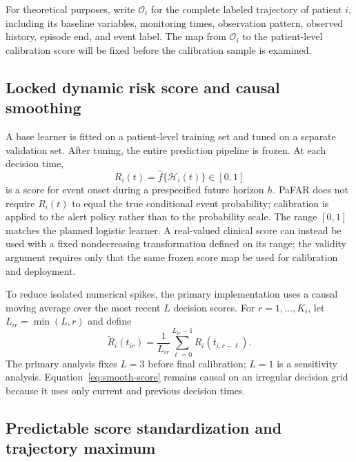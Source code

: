 \documentclass[11pt]{article}
\newcommand{\calH}{\mathcal{H}}
\begin{document}
For theoretical purposes, write $\mathcal O_i$ for the complete labeled trajectory of patient $i$, including its baseline variables, monitoring times, observation pattern, observed history, episode end, and event label. The map from $\mathcal O_i$ to the patient-level calibration score will be fixed before the calibration sample is examined.

\subsection{Locked dynamic risk score and causal smoothing}

A base learner is fitted on a patient-level training set and tuned on a separate validation set. After tuning, the entire prediction pipeline is frozen. At each decision time,
\begin{equation}
R_i(t)=\widehat f\{\calH_i(t)\}\in[0,1]
\label{eq:base-risk}
\end{equation}
is a score for event onset during a prespecified future horizon $h$. PaFAR does not require $R_i(t)$ to equal the true conditional event probability; calibration is applied to the alert policy rather than to the probability scale. The range $[0,1]$ matches the planned logistic learner. A real-valued clinical score can instead be used with a fixed nondecreasing transformation defined on its range; the validity argument requires only that the same frozen score map be used for calibration and deployment.

To reduce isolated numerical spikes, the primary implementation uses a causal moving average over the most recent $L$ decision scores. For $r=1,\ldots,K_i$, let $L_{ir}=\min(L,r)$ and define
\begin{equation}
\widetilde R_i(t_{ir})=
\frac{1}{L_{ir}}\sum_{\ell=0}^{L_{ir}-1}R_i(t_{i,r-\ell}).
\label{eq:smooth-score}
\end{equation}
The primary analysis fixes $L=3$ before final calibration; $L=1$ is a sensitivity analysis. Equation~\eqref{eq:smooth-score} remains causal on an irregular decision grid because it uses only current and previous decision times.

\subsection{Predictable score standardization and trajectory maximum}
\end{document}
